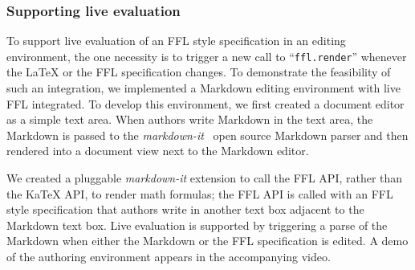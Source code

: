\subsubsection{Supporting live evaluation}\label{sec:live_evaluation}
To support live evaluation of an FFL style specification in an editing environment, the one necessity is to trigger a new call to ``\texttt{ffl.render}'' whenever the LaTeX or the FFL specification changes.
To demonstrate the feasibility of such an integration, we implemented a Markdown editing environment with live FFL integrated. To develop this environment, we first created a document editor as a simple text area. When authors write Markdown in the text area, the Markdown is passed to the \textit{markdown-it}~\cite{MarkdownIt} open source Markdown parser and then rendered into a document view next to the Markdown editor.

We created a pluggable \textit{markdown-it} extension to call the FFL API, rather than the KaTeX API, to render math formulas; the FFL API is called with an FFL style specification that authors write in another text box adjacent to the Markdown text box. Live evaluation is supported by triggering a parse of the Markdown when either the Markdown or the FFL specification is edited.  A demo of the authoring environment appears in the accompanying video.
